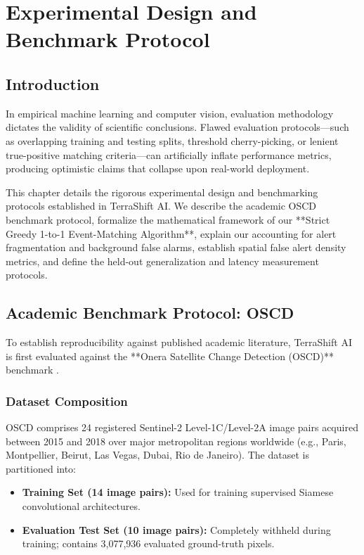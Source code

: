 \chapter{Experimental Design and Benchmark Protocol}
\label{ch:experimental_design}

\section{Introduction}
\label{sec:exp_intro}
In empirical machine learning and computer vision, evaluation methodology dictates the validity of scientific conclusions. Flawed evaluation protocols—such as overlapping training and testing splits, threshold cherry-picking, or lenient true-positive matching criteria—can artificially inflate performance metrics, producing optimistic claims that collapse upon real-world deployment.

This chapter details the rigorous experimental design and benchmarking protocols established in TerraShift AI. We describe the academic OSCD benchmark protocol, formalize the mathematical framework of our **Strict Greedy 1-to-1 Event-Matching Algorithm**, explain our accounting for alert fragmentation and background false alarms, establish spatial false alert density metrics, and define the held-out generalization and latency measurement protocols.

\section{Academic Benchmark Protocol: OSCD}
\label{sec:exp_oscd}
To establish reproducibility against published academic literature, TerraShift AI is first evaluated against the **Onera Satellite Change Detection (OSCD)** benchmark \citep{daudt2018urban}. 

\subsection{Dataset Composition}
OSCD comprises 24 registered Sentinel-2 Level-1C/Level-2A image pairs acquired between 2015 and 2018 over major metropolitan regions worldwide (e.g., Paris, Montpellier, Beirut, Las Vegas, Dubai, Rio de Janeiro). The dataset is partitioned into:
\begin{itemize}
    \item \textbf{Training Set (14 image pairs):} Used for training supervised Siamese convolutional architectures.
    \item \textbf{Evaluation Test Set (10 image pairs):} Completely withheld during training; contains 3,077,936 evaluated ground-truth pixels.
\end{itemize}

